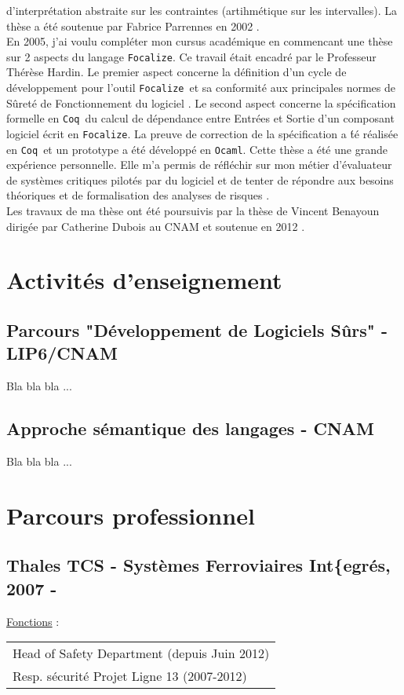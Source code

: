 \documentclass[a4paper,12pt]{article}
\newcommand{\Coq}{{\tt Coq}}
\newcommand{\Ocaml}{{\tt Ocaml}}
\newcommand{\Focal}{{\tt Focalize}}
\begin{document}
d'interpr\'etation abstraite sur les contraintes (artihm\'etique sur
les intervalles).  La th\`ese a \'et\'e soutenue par Fabrice Parrennes
en 2002 \cite{Phd-FParrennes}.
\\
En 2005, j'ai voulu compl\'eter mon cursus acad\'emique en
commencant une th\`ese sur 2 aspects du langage \Focal. Ce travail
\'etait encadr\'e par le Professeur Th\'er\`ese Hardin. Le premier
aspect concerne la d\'efinition d'un cycle de d\'eveloppement pour
l'outil \Focal\ et sa conformit\'e aux principales normes de
S\^uret\'e de Fonctionnement du logiciel \cite{TAP09, TTSS08}. Le
second aspect concerne la sp\'ecification formelle en \Coq\ du calcul
de d\'ependance entre Entr\'ees et Sortie d'un composant logiciel
\'ecrit en \Focal. La preuve de correction de la sp\'ecification a
\'t\'e r\'ealis\'ee en \Coq\ et un prototype a \'et\'e d\'evelopp\'e
en \Ocaml. Cette th\`ese a \'et\'e une grande exp\'erience
personnelle. Elle m'a permis de r\'efl\'echir sur mon m\'etier
d'\'evaluateur de syst\`emes critiques pilot\'es par du logiciel et de
tenter de r\'epondre aux besoins th\'eoriques et de formalisation des
analyses de risques \cite{Phd-PAyrault}.
\\
Les travaux de ma th\`ese ont \'et\'e poursuivis par la th\`ese de Vincent
Benayoun dirig\'ee par Catherine Dubois au CNAM et soutenue en 2012
\cite{Phd-VBenayoun, SEFM2012}.

\section{Activit\'es d'enseignement}
\subsection{Parcours "D\'eveloppement de Logiciels S\^urs" - LIP6/CNAM}
Bla bla bla ...

\subsection{Approche s\'emantique des langages - CNAM}
Bla bla bla ...


\newpage
\section{Parcours professionnel}
\subsection{Thales TCS - Syst\`emes Ferroviaires Int\{egr\'es, 2007 - }
\hspace{-0.6cm}\underline{Fonctions} : 
\begin{tabular}{l}
Head of Safety Department (depuis Juin 2012)\\
Resp. s\'ecurit\'e Projet Ligne 13 (2007-2012) \\
\end{tabular}
\end{document}
